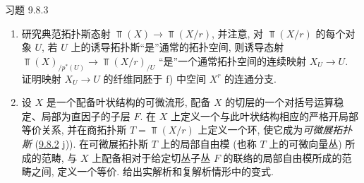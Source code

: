 \begin{enonce*}[remark]{习题 9.8.3}
\begin{enumerate}
\item 研究典范拓扑斯态射 $\Top(X)\rightarrow\Top(X/r)$,
并注意\pageoriginale, 对 $\Top(X/r)$ 的每个对象 $U$,
若 $U$ 上的诱导拓扑斯“是”通常的拓扑空间,
则诱导态射 $\Top(X)_{/p^{\ast}(U)}\rightarrow\Top(X/r)_{/U}$
“是”一个通常拓扑空间的连续映射 $X_U\rightarrow U$.
证明映射 $X_U\rightarrow U$ 的纤维同胚于 f) 中空间 $X^r$ 的连通分支.

\item 设 $X$ 是一个配备叶状结构的可微流形,
\ie 配备 $X$ 的切层的一个对括号运算稳定、局部为直因子的子层 $F$.
在 $X$ 上定义一个与此叶状结构相应的严格开局部等价关系,
并在商拓扑斯 $T=\Top(X/r)$ 上定义一个环,
使它成为\emph{可微展拓扑斯} (\hyperref[IV.exer9.8.2]{9.8.2} j)).
在可微展拓扑斯 $T$ 上的局部自由模
(也称 $T$ 上的可微向量丛) 所成的范畴,
与 $X$ 上配备相对于给定切丛子丛 $F$ 的联络的局部自由模所成的范畴之间,
定义一个等价.
给出实解析和复解析情形中的变式.
\end{enumerate}
\end{enonce*}




